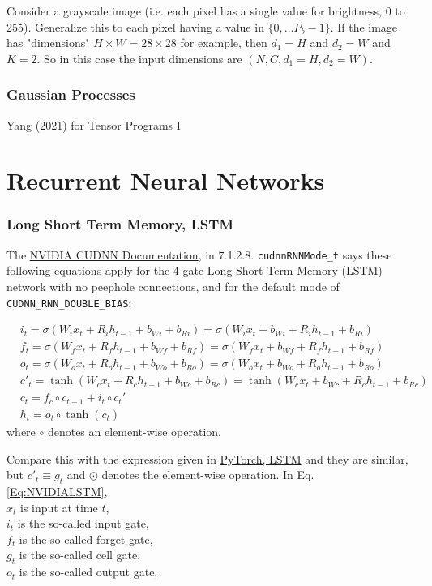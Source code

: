 \documentclass[10pt]{amsart}
\begin{document}
\begin{multicols*}{2}
Consider a grayscale image (i.e. each pixel has a single value for brightness, 0 to 255). Generalize this to each pixel having a value in $\lbrace 0, \dots P_b - 1 \rbrace$. If the image has "dimensions" $H \times W = 28 \times 28$ for example, then $d_1 = H$ and $d_2 = W$ and $K = 2$. So in this case the input dimensions are $(N, C, d_1 = H, d_2 = W)$.

\section{Gaussian Processes}
Yang (2021) for Tensor Programs I\cite{Yang2021}

\part{Recurrent Neural Networks}

\section{Long Short Term Memory, LSTM}

The \href{https://docs.nvidia.com/deeplearning/cudnn/api/index.html}{NVIDIA CUDNN Documentation}, in 7.1.2.8. \verb|cudnnRNNMode_t| says these following equations apply for the 4-gate Long Short-Term Memory (LSTM) network with no peephole connections, and for the default mode of \verb|CUDNN_RNN_DOUBLE_BIAS|:

\begin{equation}\label{Eq:NVIDIALSTM}
\begin{aligned}
& i_t = \sigma(W_i x_t + R_i h_{t-1} + b_{Wi} + b_{Ri}) = \sigma(W_i x_t + b_{Wi} + R_i h_{t-1} + b_{Ri}) \\
& f_t = \sigma(W_f x_t + R_f h_{t-1} + b_{Wf} + b_{Rf}) = \sigma(W_f x_t + b_{Wf} + R_f h_{t-1} + b_{Rf}) \\
& o_t = \sigma(W_o x_t + R_o h_{t-1} + b_{Wo} + b_{Ro}) = \sigma(W_o x_t + b_{Wo} + R_o h_{t-1} + b_{Ro}) \\
& c'_t = \tanh{ (W_c x_t + R_c h_{t-1} + b_{Wc} + b_{Rc})} = \tanh{ (W_c x_t + b_{Wc} + R_c h_{t-1} + b_{Rc})} \\
& c_t = f_c \circ c_{t-1} + i_t \circ c_t' \\
& h_t = o_t \circ \tanh{ (c_t)} 
\end{aligned}
\end{equation}
where $\circ$ denotes an element-wise operation.

Compare this with the expression given in \href{https://pytorch.org/docs/stable/generated/torch.nn.LSTM.html#torch.nn.LSTM}{PyTorch, LSTM} and they are similar, but $c'_t \equiv g_t$ and $\odot$ denotes the element-wise operation. In Eq. \ref{Eq:NVIDIALSTM}, \\
$x_t$ is input at time $t$, \\
$i_t$ is the so-called input gate, \\
$f_t$ is the so-called forget gate, \\
$g_t$ is the so-called cell gate, \\
$o_t$ is the so-called output gate, \\


\end{multicols*}
\end{document}
